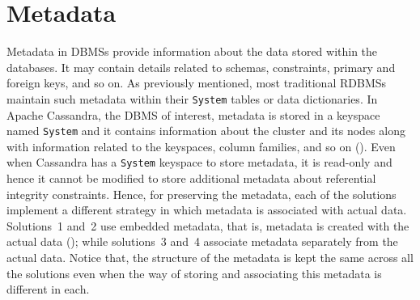 \section{Metadata}\label{s:design-Metadata}
Metadata in \acp{DBMS} provide information about the data stored within the
databases.
It may contain details related to schemas, constraints,  primary and foreign
keys, and so on.   As previously mentioned,  most traditional \acp{RDBMS}
maintain such metadata within their \texttt{System}  tables or data
dictionaries.
In Apache Cassandra, the \ac{DBMS} of interest, metadata is stored in a keyspace
named \texttt{System} and it contains information about the cluster and its
nodes along with information related to the keyspaces, column families, and so
on ().
 Even when Cassandra has a  \texttt{System} keyspace to store metadata, it is
 read-only and hence it cannot be modified to store additional metadata about
 referential integrity constraints.
Hence,  for preserving the metadata, each of the solutions implement a 
different strategy in which metadata is associated with actual data. Solutions~1
and~2 use embedded metadata, that is, metadata is created with the actual data
(); while solutions~3 and~4 associate metadata separately
from the actual data.  Notice that, the structure
 of the metadata is kept the same across all the solutions even when  the way of
 storing and associating this metadata is different in each.

